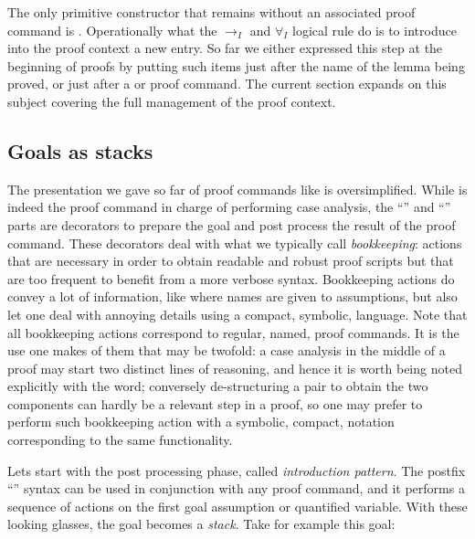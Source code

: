 The only primitive constructor that remains without an associated proof command
is .  Operationally what the $\to_I$ and
$\forall_I$ logical rule do is to introduce into the proof context a
new entry.  So far we either expressed this step at the beginning of proofs
by putting such items just after the name of the lemma being proved, or
just after a  or  proof command.  The current section
expands on this subject covering the full management of the proof context.

\subsection{Goals as stacks}\label{ssec:stack}

The presentation we gave so far of proof commands like 
is oversimplified.  While  is indeed the proof command in
charge of performing case analysis, the ``'' and ``\C{=> [|m]}''
parts are decorators to prepare the goal and post process the result of
the proof command.  These decorators deal with what we typically call
\emph{bookkeeping}: actions that are necessary in order to obtain readable and
robust proof scripts but that are too frequent to benefit from a more verbose
syntax.  Bookkeeping actions do convey a lot of information, like where
names are given to assumptions, but also let one deal with annoying details
using a compact, symbolic, language.  Note that all bookkeeping actions
correspond to regular, named, proof commands.  It is the use one makes of them
that may be twofold: a case analysis in the middle of a proof may start two
distinct lines of reasoning, and hence it is worth being noted explicitly with
the  word; conversely de-structuring a pair to obtain the two
components can hardly be a relevant step in a proof, so one may prefer to
perform such bookkeeping action with a symbolic, compact, notation
corresponding to the same  functionality.


Lets start with the post processing phase, called \emph{introduction pattern}.
The postfix ``'' syntax can be used in conjunction with any proof
command, and it performs a sequence of actions on the first goal assumption or
quantified variable.  With these looking glasses, the goal becomes a
\emph{stack}. Take for example this goal:

